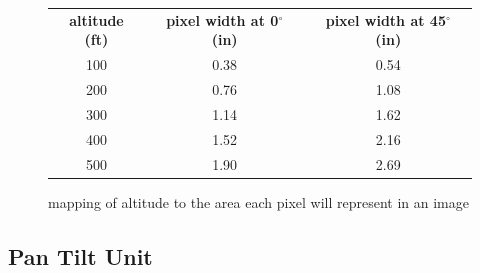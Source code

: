 \documentclass[10pt]{report}
\begin{document}
\begin{figure} [H]
	\centering
		\begin{tabular}{ccc}
		\\{\bf altitude (ft)} & {\bf pixel width at 0$^{\circ}$ (in)} & {\bf pixel width at 45$^{\circ}$ (in)} \\
	       100 &       0.38 &       0.54 \\
	       200 &       0.76 &       1.08 \\
	       300 &       1.14 &       1.62 \\
	       400 &       1.52 &       2.16 \\
	       500 &       1.90 &       2.69 \\
		\end{tabular}
		\caption[Pixel Width Mapping]{mapping of altitude to the area each pixel will represent in an image}
		\label{fig:pixelmapping}
\end{figure}

\subsection{Pan Tilt Unit}
\end{document}
